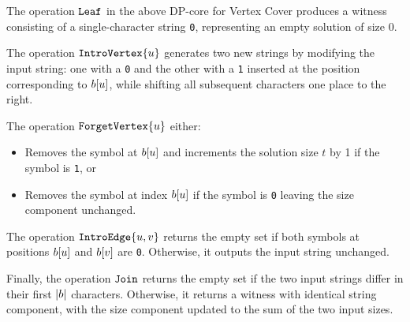 The operation $\texttt{Leaf}$ in the above DP-core for {\sc Vertex Cover} produces a witness consisting of a single-character string \texttt{0}, representing an empty solution of size 0.

The operation $\texttt{IntroVertex}\{u\}$ generates two new strings by modifying the input string: one with a \texttt{0} and the other with a \texttt{1} inserted at the position corresponding to $b[u]$, while shifting all subsequent characters one place to the right.

The operation $\texttt{ForgetVertex}\{u\}$ either:
\begin{itemize}
    \item Removes the symbol at $b[u]$ and increments the solution size \(t\) by 1 if the symbol is \texttt{1}, or
    \item Removes the symbol at index $b[u]$ if the symbol is \texttt{0} leaving the size component unchanged.
\end{itemize}

The operation $\texttt{IntroEdge}\{u,v\}$ returns the empty set if both symbols at positions $b[u]$ and $b[v]$ are \texttt{0}. Otherwise, it outputs the input string unchanged.

Finally, the operation $\texttt{Join}$ returns the empty set if the two input strings differ in their first $|b|$ characters. Otherwise, it returns a witness with identical string component, with the size component updated to the sum of the two input sizes.






